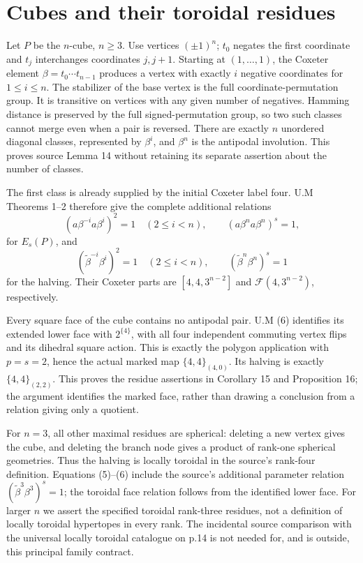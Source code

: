 \section{Cubes and their toroidal residues}\label{cubes-and-their-toroidal-residues}

Let \(P\) be the \(n\)-cube, \(n\ge3\). Use vertices \((\pm1)^n\); \(t_0\) negates the first coordinate and \(t_j\) interchanges coordinates \(j,j+1\). Starting at \((1,\ldots,1)\), the Coxeter element \(\beta=t_0\cdots t_{n-1}\) produces a vertex with exactly \(i\) negative coordinates for \(1\le i\le n\). The stabilizer of the base vertex is the full coordinate-permutation group. It is transitive on vertices with any given number of negatives. Hamming distance is preserved by the full signed-permutation group, so two such classes cannot merge even when a pair is reversed. There are exactly \(n\) unordered diagonal classes, represented by \(\beta^i\), and \(\beta^n\) is the antipodal involution. This proves source Lemma 14 without retaining its separate assertion about the number of classes.

The first class is already supplied by the initial Coxeter label four. U.M Theorems 1--2 therefore give the complete additional relations
\[
 (a\beta^{-i}a\beta^i)^2=1\quad(2\le i<n),
 \qquad (a\beta^n a\beta^n)^s=1,              \tag{5}
\]
for \(E_s(P)\), and
\[
 (\widetilde\beta^{-i}\beta^i)^2=1\quad(2\le i<n),
 \qquad (\widetilde\beta^n\beta^n)^s=1        \tag{6}
\]
for the halving. Their Coxeter parts are \([4,4,3^{n-2}]\) and \(\mathcal F(4,3^{n-2})\), respectively.

Every square face of the cube contains no antipodal pair. U.M (6) identifies its extended lower face with \(2^{\{4\}}\), with all four independent commuting vertex flips and its dihedral square action. This is exactly the polygon application with \(p=s=2\), hence the actual marked map \(\{4,4\}_{(4,0)}\). Its halving is exactly \(\{4,4\}_{(2,2)}\). This proves the residue assertions in Corollary 15 and Proposition 16; the argument identifies the marked face, rather than drawing a conclusion from a relation giving only a quotient.

For \(n=3\), all other maximal residues are spherical: deleting a new vertex gives the cube, and deleting the branch node gives a product of rank-one spherical geometries. Thus the halving is locally toroidal in the source's rank-four definition. Equations (5)--(6) include the source's additional parameter relation \((\widetilde\beta^3\beta^3)^s=1\); the toroidal face relation follows from the identified lower face. For larger \(n\) we assert the specified toroidal rank-three residues, not a definition of locally toroidal hypertopes in every rank. The incidental source comparison with the universal locally toroidal catalogue on p.14 is not needed for, and is outside, this principal family contract.

